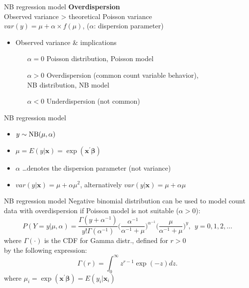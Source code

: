 \documentclass[usenames,dvipsnames]{beamer}
\begin{document}
\begin{frame}{NB regression model}
\textbf{Overdispersion}\\
\bigskip
Observed variance > theoretical Poisson variance \\
\medskip
$\textit{var} (y) = \mu + \alpha \times f(\mu)$, \quad ($\alpha$: dispersion parameter)\\
\medskip
\begin{itemize}
\item Observed variance \& implications
\vspace{0.3cm}
\begin{itemize}
\item[$\alpha = 0$] Poisson distribution, Poisson model
\vspace{0.2cm}
\item[$\alpha > 0$] Overdispersion (common count variable behavior), \\NB distribution, NB model
\vspace{0.2cm}
\item [$\alpha < 0$]  Underdispersion  (not common)
\end{itemize}
\end{itemize}
\end{frame}
\begin{frame}{NB regression model}
\begin{itemize}
\item $y \sim \textnormal{NB}(\mu, \alpha)$\\
\bigskip
\item $\mu = E(y|\bm{x}) = \exp (\bm{x}^{\prime} \bm{\beta})$\\
\bigskip
\item $\alpha$ \dots denotes the dispersion parameter (not variance)\\
\bigskip
\item $\textit{var} (y|\bm{x}) = \mu + \alpha \mu^2$, alternatively $\textit{var} (y|\bm{x}) = \mu + \alpha \mu$
\end{itemize}
\end{frame}
\begin{frame}{NB regression model}
Negative binomial distribution can be used to model count data with overdispersion if Poisson model is not suitable ($\alpha > 0$): \\
\bigskip
$$P(Y \!=y|\mu, \alpha) = \frac{\Gamma(y+\alpha^{-1})}{y! \Gamma(\alpha^{-1})} \Big(\frac{\alpha^{-1}}{\alpha^{-1} + \mu}\Big)^{\alpha^{-1}} \! \Big( \frac{\mu}{\alpha^{-1} + \mu} \Big)^{y}, ~~y=0,1,2,\dots$$
\bigskip
where $\Gamma(\cdot)$ is the CDF  for Gamma distr., defined for $r>0$ 
\vspace{-0.3cm}
\\by the following expression: 
$$\Gamma(r) = \int_0^{\infty} z^{r-1} \exp (-z) dz.$$
\medskip
where $\mu_i = \exp (\bm{x}^{\prime} \bm{\beta}) = E(y_i|\bm{x}_i)$
\end{frame}
\end{document}
